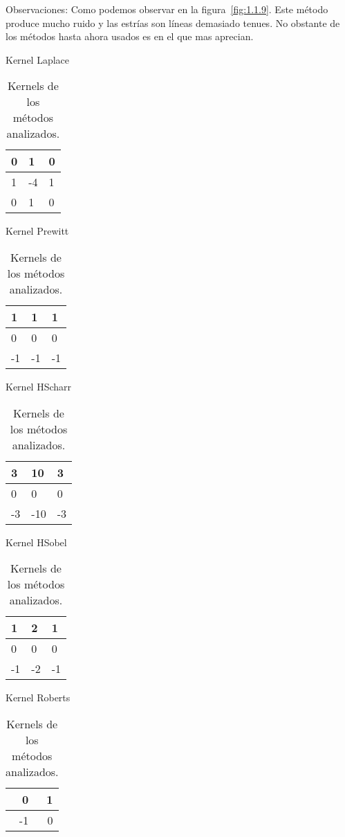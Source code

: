 Observaciones:
Como podemos observar en la figura~\ref{fig:1.1.9}.
Este método produce mucho ruido y las estrías son líneas demasiado tenues.
No obstante de los métodos hasta ahora usados es en el que mas aprecian.


\begin{table}[]

	\begin{minipage}{.5\linewidth}
		\centering
		\caption{Kernel Laplace}
		\label{F_k1}
		\begin{tabular}{|l|l|l|}
			\hline
			0 & 1  & 0 \\ \hline
			1 & -4 & 1 \\ \hline
			0 & 1  & 0 \\ \hline
		\end{tabular}
    \end{minipage}%
	\begin{minipage}{.5\linewidth}
		\centering
		\caption{Kernel Prewitt}
		\label{F_k2}
		\begin{tabular}{|l|l|l|}
			\hline
			1  & 1   & 1 \\ \hline
			0  & 0   & 0 \\ \hline
			-1 & -1  & -1 \\ \hline
		\end{tabular}
    \end{minipage}%

	\begin{minipage}{.5\linewidth}
		\centering
		\caption{Kernel HScharr}
		\label{F_k3}
		\begin{tabular}{|l|l|l|}
			\hline
			3  & 10  & 3 \\ \hline
			0  & 0   & 0 \\ \hline
			-3 & -10 & -3 \\ \hline
		\end{tabular}
    \end{minipage}%
	\begin{minipage}{.5\linewidth}
		\centering
		\caption{Kernel HSobel}
		\label{F_k4}
		\begin{tabular}{|l|l|l|}
			\hline
			1  & 2  & 1 \\ \hline
			0  & 0  & 0 \\ \hline
			-1 & -2 & -1 \\ \hline
		\end{tabular}
    \end{minipage}%
    
	\begin{minipage}{.5\linewidth}
		\centering
		\caption{Kernel Roberts}
		\label{F_k5}
		\begin{tabular}{|r|r|}
			\hline
			0  & 1 \\ \hline
			-1 & 0 \\ \hline
		\end{tabular}
    \end{minipage}%
	\caption{Kernels de los métodos analizados.}
\end{table}


